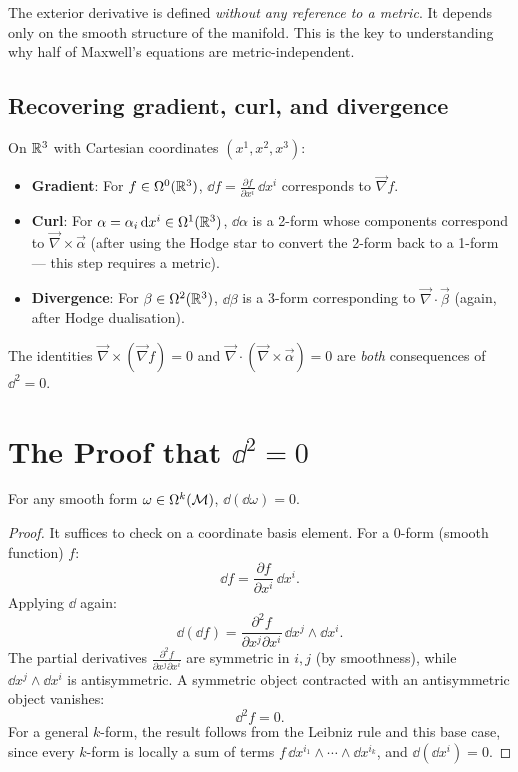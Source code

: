 \begin{remark}
The exterior derivative is defined \emph{without any reference to a metric}. It depends only on the smooth structure of the manifold. This is the key to understanding why half of Maxwell's equations are metric-independent.
\end{remark}

\subsection{Recovering gradient, curl, and divergence}

On $\mathbb{R}^3$ with Cartesian coordinates $(x^1, x^2, x^3)$:

\begin{itemize}
\item \textbf{Gradient}: For $f \in \Omega^0(\mathbb{R}^3)$, $\dd f = \frac{\partial f}{\partial x^i}\,\dd x^i$ corresponds to $\vec{\nabla}f$.
\item \textbf{Curl}: For $\alpha = \alpha_i\,\mathrm{d} x^i \in \Omega^1(\mathbb{R}^3)$, $\dd\alpha$ is a 2-form whose components correspond to $\vec{\nabla}\times\vec{\alpha}$ (after using the Hodge star to convert the 2-form back to a 1-form --- this step requires a metric).
\item \textbf{Divergence}: For $\beta \in \Omega^2(\mathbb{R}^3)$, $\dd\beta$ is a 3-form corresponding to $\vec{\nabla}\cdot\vec{\beta}$ (again, after Hodge dualisation).
\end{itemize}

The identities $\vec{\nabla}\times(\vec{\nabla}f) = 0$ and $\vec{\nabla}\cdot(\vec{\nabla}\times\vec{\alpha}) = 0$ are \emph{both} consequences of $\dd^2 = 0$.

\section{The Proof that $\dd^2 = 0$}

\begin{theorem}
For any smooth form $\omega \in \Omega^k(\mathcal{M})$, $\dd(\dd\omega) = 0$.
\end{theorem}

\begin{proof}
It suffices to check on a coordinate basis element. For a 0-form (smooth function) $f$:
\begin{equation}
\dd f = \frac{\partial f}{\partial x^i}\,\dd x^i.
\end{equation}
Applying $\dd$ again:
\begin{equation}
\dd(\dd f) = \frac{\partial^2 f}{\partial x^j \partial x^i}\,\dd x^j \wedge \dd x^i.
\end{equation}
The partial derivatives $\frac{\partial^2 f}{\partial x^j \partial x^i}$ are symmetric in $i, j$ (by smoothness), while $\dd x^j \wedge \dd x^i$ is antisymmetric. A symmetric object contracted with an antisymmetric object vanishes:
\begin{equation}
\dd^2 f = 0.
\end{equation}
For a general $k$-form, the result follows from the Leibniz rule and this base case, since every $k$-form is locally a sum of terms $f\,\dd x^{i_1}\wedge\cdots\wedge\dd x^{i_k}$, and $\dd(\dd x^i) = 0$.
\end{proof}

